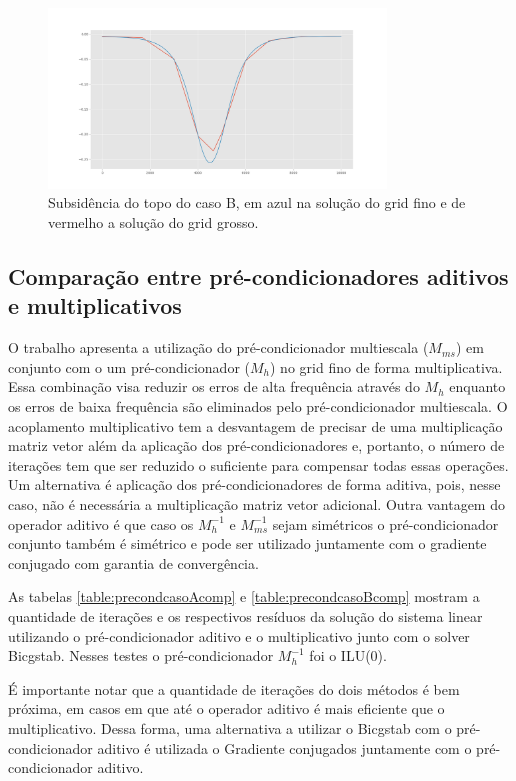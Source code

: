 \begin{figure}[!htbp]
\centering
\includegraphics[width=0.8\textwidth]{chap08/figs/Reservoir320x320_10x10_subsidence_multiscale.png}
\caption{Subsidência do topo do caso B, em azul na solução do grid fino e de vermelho a solução do grid grosso. }
\label{fig:subsidence} 
\end{figure}


\subsection{Comparação entre pré-condicionadores aditivos e multiplicativos}

O trabalho \cite{casteletto} apresenta a utilização do pré-condicionador multiescala ($M_{ms}$) em conjunto com o um pré-condicionador ($M_h$) no grid fino de forma multiplicativa. 
Essa combinação visa reduzir os erros de alta frequência através do $M_h$ enquanto os erros de baixa frequência são eliminados pelo pré-condicionador multiescala. 
O acoplamento multiplicativo tem a desvantagem de precisar de uma multiplicação matriz vetor além da aplicação dos pré-condicionadores
e, portanto, o número de iterações tem que ser reduzido o suficiente para compensar todas essas operações. Um alternativa é aplicação
dos pré-condicionadores de forma aditiva, pois, nesse caso, não é necessária a multiplicação matriz vetor adicional. Outra vantagem do operador aditivo é que caso os $M_h^{-1}$ e $M_{ms}^{-1}$ sejam simétricos o pré-condicionador conjunto também é simétrico e pode ser utilizado juntamente com o gradiente conjugado com garantia de convergência.


As tabelas \ref{table:precondcasoAcomp} e \ref{table:precondcasoBcomp} mostram a quantidade de iterações e os respectivos resíduos da solução do sistema linear utilizando o pré-condicionador aditivo e o multiplicativo junto com o solver Bicgstab. Nesses testes o pré-condicionador $M_h^{-1}$ foi o ILU(0).

É importante notar que a quantidade de iterações do dois métodos é bem próxima, em casos em que até o operador aditivo é mais eficiente que o multiplicativo. Dessa forma, uma alternativa a utilizar o Bicgstab com o pré-condicionador aditivo é utilizada o Gradiente conjugados juntamente com o pré-condicionador aditivo.


